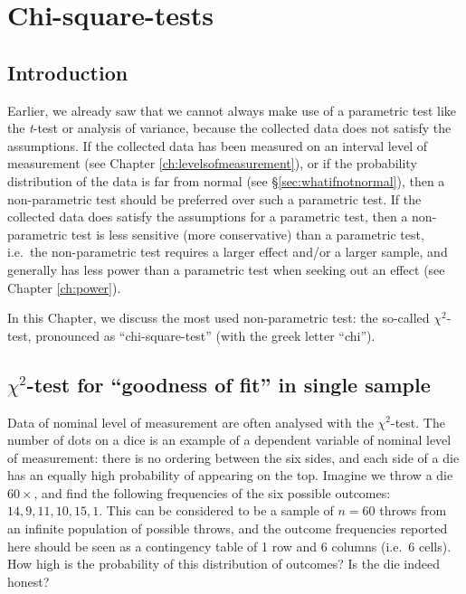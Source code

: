\documentclass[
]{book}
\begin{document}
\hypertarget{ch:chi-square-tests}{%
\chapter{Chi-square-tests}\label{ch:chi-square-tests}}

\hypertarget{sec:ch16introduction}{%
\section{Introduction}\label{sec:ch16introduction}}

Earlier, we already saw that we cannot always make use of a
parametric test like the \emph{t}-test or analysis of variance, because
the collected data does not satisfy the assumptions. If the collected data
has been measured on an interval level of measurement (see Chapter
\ref{ch:levelsofmeasurement}), or if the probability distribution
of the data is far from normal (see
§\ref{sec:whatifnotnormal}), then a non-parametric test should be
preferred over such a parametric test. If the collected data
does satisfy the assumptions for a parametric test, then a non-parametric
test is less sensitive (more conservative) than a parametric test, i.e.~the
non-parametric test requires a larger effect and/or a larger sample, and generally
has less power than a parametric test when seeking out an effect
(see Chapter \ref{ch:power}).

In this Chapter, we discuss the most used non-parametric
test: the so-called \(\chi^2\)-test, pronounced as ``chi-square-test'' (with the greek letter ``chi'').

\hypertarget{sec:chi2gof}{%
\section{\texorpdfstring{\(\chi^2\)-test for ``goodness of fit'' in single sample}{\textbackslash chi\^{}2-test for ``goodness of fit'' in single sample}}\label{sec:chi2gof}}

Data of nominal level of measurement are often analysed with the
\(\chi^2\)-test. The number of dots on a dice
is an example of a dependent variable of nominal level of measurement:
there is no ordering between the six sides, and each side of a die has
an equally high probability of appearing on the top. Imagine we throw
a die \(60\times\), and find the following frequencies
of the six possible outcomes: \(14, 9, 11, 10, 15, 1\). This can be
considered to be a sample of \(n=60\) throws from an infinite
population of possible throws, and the outcome frequencies reported here should
be seen as a contingency table of 1 row and 6
columns (i.e.~6 cells). How high is the probability of this distribution
of outcomes? Is the die indeed honest?
\end{document}
